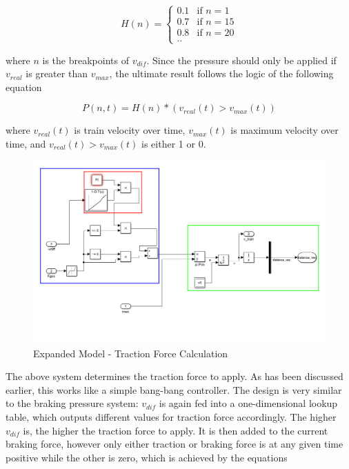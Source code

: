 \begin{equation}
\label{eq:lookuptable}
H(n) =
\begin{cases}
0.1 & \text{if $n=1$} \\
0.7 & \text{if $n=15$} \\
0.8 & \text{if $n=20$} \\
\text{..}
\end{cases}
\end{equation}

\noindent
where $n$ is the breakpoints of $v_{dif}$. Since the pressure should only be applied if $v_{real}$ is greater than $v_{max}$, the ultimate result follows the logic of the following equation

\begin{equation}
\label{eq:brakingpressure}
P(n,t) = H(n) * (v_{real}(t) > v_{max}(t))
\end{equation}

\noindent
where $v_{real}(t)$ is train velocity over time, $v_{max}(t)$ is maximum velocity over time, and $v_{real}(t) > v_{max}(t)$ is either 1 or 0.

\begin{figure}[H]
	\centering
	\includegraphics[width=\linewidth]{./pic/expandedmodel_force}
	\caption{Expanded Model - Traction Force Calculation}
	\label{fig:expandedmodel_force}
\end{figure}

\par\noindent
The above system determines the traction force to apply. As has been discussed earlier, this works like a simple bang-bang controller. The design is very similar to the braking pressure system: $v_{dif}$ is again fed into a one-dimensional lookup table, which outputs different values for traction force accordingly. The higher $v_{dif}$ is, the higher the traction force to apply. It is then added to the current braking force, however only either traction or braking force is at any given time positive while the other is zero, which is achieved by the equations
 

